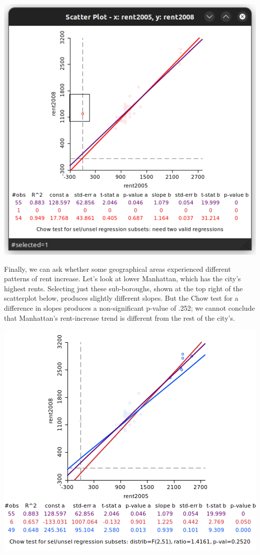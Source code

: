 \documentclass[11pt]{article}
\begin{document}
\begin{center}
\includegraphics[width=.9\linewidth]{scatter_excluding_outlier.png}
\end{center}

Finally, we can ask whether some geographical areas experienced different patterns of rent increase. Let's look at lower Manhattan, which has the city's highest rents. Selecting just these sub-boroughs, shown at the top right of the scatterplot below, produces slightly different slopes. But the Chow test for a difference in slopes produces a non-significant p-value of .252; we cannot conclude that Manhattan's rent-increase trend is different from the rest of the city's.

\begin{center}
\includegraphics[width=.9\linewidth]{scatter_lower_manhattan.png}
\end{center}
\end{document}

